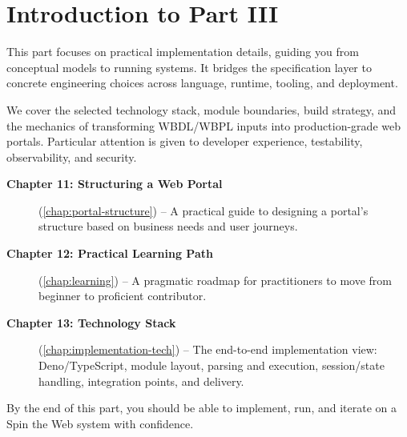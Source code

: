 
\chapter*{Introduction to Part III}
\label{part:implementation}

This part focuses on practical implementation details, guiding you from conceptual models to running systems. It bridges the specification layer to concrete engineering choices across language, runtime, tooling, and deployment.

We cover the selected technology stack, module boundaries, build strategy, and the mechanics of transforming WBDL/WBPL inputs into production-grade web portals. Particular attention is given to developer experience, testability, observability, and security.

\begin{description}
\item[\textbf{Chapter 11: Structuring a Web Portal}] (\cref{chap:portal-structure}) -- A practical guide to designing a portal's structure based on business needs and user journeys.

\item[\textbf{Chapter 12: Practical Learning Path}] (\cref{chap:learning}) -- A pragmatic roadmap for practitioners to move from beginner to proficient contributor.

\item[\textbf{Chapter 13: Technology Stack}] (\cref{chap:implementation-tech}) -- The end-to-end implementation view: Deno/TypeScript, module layout, parsing and execution, session/state handling, integration points, and delivery.
\end{description}

By the end of this part, you should be able to implement, run, and iterate on a Spin the Web system with confidence.
